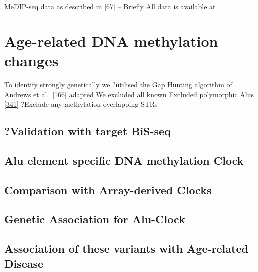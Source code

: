 \documentclass[
]{book}
\begin{document}
MeDIP-seq data as described in {[}\protect\hyperlink{ref-Bell2017a}{67}{]} -- Briefly All data is available at

\hypertarget{age-related-dna-methylation-changes}{%
\section{Age-related DNA methylation changes}\label{age-related-dna-methylation-changes}}

To identify strongly genetically we ?utilised the Gap Hunting algorithm of Andrews et al.~{[}\protect\hyperlink{ref-Andrews2016}{166}{]} adapted
We excluded all known
Excluded polymorphic Alus {[}\protect\hyperlink{ref-Payer2017}{341}{]}
?Exclude any methylation overlapping STRs

\hypertarget{validation-with-target-bis-seq}{%
\subsection{?Validation with target BiS-seq}\label{validation-with-target-bis-seq}}

\hypertarget{alu-element-specific-dna-methylation-clock-1}{%
\subsection{Alu element specific DNA methylation Clock}\label{alu-element-specific-dna-methylation-clock-1}}

\hypertarget{comparison-with-array-derived-clocks}{%
\subsection{Comparison with Array-derived Clocks}\label{comparison-with-array-derived-clocks}}

\hypertarget{genetic-association-for-alu-clock}{%
\subsection{Genetic Association for Alu-Clock}\label{genetic-association-for-alu-clock}}

\hypertarget{association-of-these-variants-with-age-related-disease}{%
\subsection{Association of these variants with Age-related Disease}\label{association-of-these-variants-with-age-related-disease}}
\end{document}
